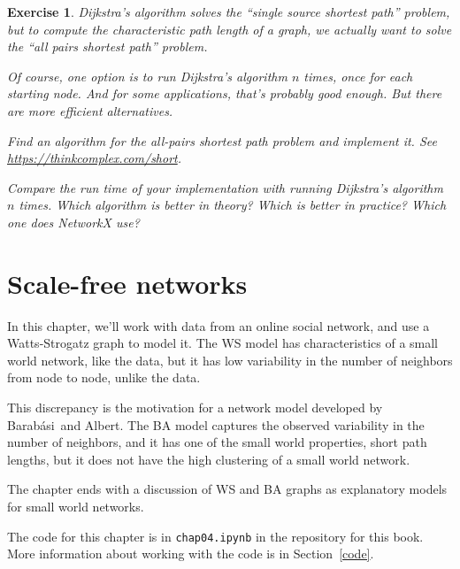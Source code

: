 \documentclass[12pt]{book}
\theoremstyle{exercise}
\newtheorem{exercise}{Exercise}[chapter]
\begin{document}
\begin{exercise}

Dijkstra's algorithm solves the ``single source shortest path''
problem, but to compute the characteristic path length of a graph,
we actually want to solve the ``all pairs shortest path'' problem.


Of course, one option is to run Dijkstra's algorithm $n$ times,
once for each starting node.  And for some applications, that's
probably good enough.  But there are more efficient alternatives.

Find an algorithm for the all-pairs shortest path problem and
implement it.  See
\url{https://thinkcomplex.com/short}.

Compare the run time of your implementation with running
Dijkstra's algorithm $n$ times.  Which algorithm is better in
theory?  Which is better in practice?  Which one does NetworkX
use?


\end{exercise}



\chapter{Scale-free networks}
\label{scale-free}

\newcommand{\Barabasi}{Barab\'{a}si}

In this chapter, we'll work with data from an online social network, and use a
Watts-Strogatz graph to model it.  The WS model has characteristics of
a small world network, like the data, but it has low
variability in the number of neighbors from node to node,
unlike the data.

This discrepancy is the motivation for a network model developed
by \Barabasi~and Albert.  The BA model captures the observed variability
in the number of neighbors, and it has one of the small world
properties, short path lengths, but it does not have the high
clustering of a small world network.

The chapter ends with a discussion of WS and BA graphs as explanatory
models for small world networks.

The code for this chapter is in {\tt chap04.ipynb} in the repository
for this book.  More information about working with the code is
in Section~\ref{code}.
\end{document}
